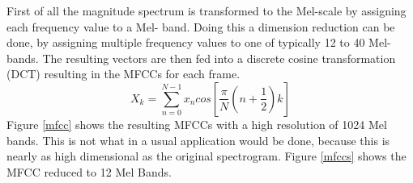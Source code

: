 \FloatBarrier
\noindent First of all the magnitude spectrum is transformed to the Mel-scale by assigning each frequency value to a Mel- band.
Doing this a dimension reduction can be done, by assigning multiple frequency values to one of typically 12 to 40 Mel-bands. The resulting vectors are then fed into a discrete cosine transformation (DCT) resulting in the MFCCs for each frame. 
\begin{equation} \label{eq:dct}
X_k = \sum_{n=0}^{N-1}{x_n cos\left[{\frac{\pi}{N}(n + \frac{1}{2})k}\right]}
\end{equation}
Figure \ref{mfcc} shows the resulting MFCCs with a high resolution of 1024 Mel bands. This is not what in a usual application would be done, because this is nearly as high dimensional as the original spectrogram. Figure \ref{mfccs} shows the MFCC reduced to 12 Mel Bands.

